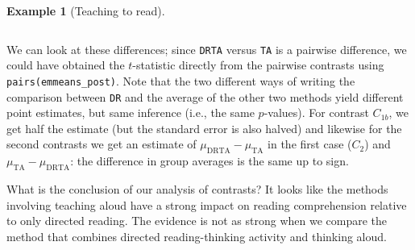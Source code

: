\documentclass[
  11pt,
  letterpaper,
]{scrbook}
\theoremstyle{definition}
\newtheorem{example}{Example}[chapter]
\theoremstyle{definition}
\theoremstyle{remark}
\begin{document}
\begin{example}[Teaching to
read]
\begin{longtable}[t]{lrrrrr}
\end{longtable}

We can look at these differences; since \texttt{DRTA} versus \texttt{TA}
is a pairwise difference, we could have obtained the \(t\)-statistic
directly from the pairwise contrasts using
\texttt{pairs(emmeans\_post)}. Note that the two different ways of
writing the comparison between \texttt{DR} and the average of the other
two methods yield different point estimates, but same inference (i.e.,
the same \(p\)-values). For contrast \(C_{1b}\), we get half the
estimate (but the standard error is also halved) and likewise for the
second contrasts we get an estimate of
\(\mu_{\mathrm{DRTA}} - \mu_{\mathrm{TA}}\) in the first case (\(C_2\))
and \(\mu_{\mathrm{TA}} - \mu_{\mathrm{DRTA}}\): the difference in group
averages is the same up to sign.

What is the conclusion of our analysis of contrasts? It looks like the
methods involving teaching aloud have a strong impact on reading
comprehension relative to only directed reading. The evidence is not as
strong when we compare the method that combines directed
reading-thinking activity and thinking aloud.

\end{example}
\end{document}
